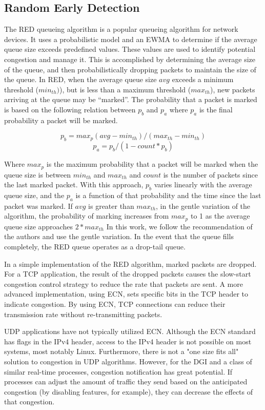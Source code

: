 \subsection{Random Early Detection}
The \ac{RED} queueing algorithm is a popular queueing algorithm for network devices.
It uses a probabilistic model and an \ac{EWMA} to determine if the average queue size exceeds predefined values.
These values are used to identify potential congestion and manage it.
This is accomplished by determining the average size of the queue, and then probabilistically dropping packets to maintain the size of the queue.
In \ac{RED}, when the average queue size $avg$ exceeds a minimum threshold ($min_{th})$), but is less than a maximum threshold ($max_{th}$), new packets arriving at the queue may be ``marked''.
The probability that a packet is marked is based on the following relation between $p_{b}$ and $p_{a}$ where $p_{a}$ is the final probability a packet will be marked.

\begin{equation}
p_{b} = max_p (avg - min_{th}) / (max_{th}-min_{th})
\end{equation}
\begin{equation}
p_{a} = p_{b} / (1-count * p_b)
\end{equation}

Where $max_p$ is the maximum probability that a packet will be marked when the queue size is between $min_{th}$ and $max_{th}$ and $count$ is the number of packets since the last marked packet.
With this approach, $p_{b}$ varies linearly with the average queue size, and the $p_{a}$ is a function of that probability and the time since the last packet was marked.
If $avg$ is greater than $max_{th}$, in the gentle variation of the algorithm, the probability of marking increases from $max_p$ to 1 as the average queue size approaches $2*max_{th}$
In this work, we follow the recommendation of the authors and use the gentle variation.
In the event that the queue fills completely, the \ac{RED} queue operates as a drop-tail queue.

In a simple implementation of the \ac{RED} algorithm, marked packets are dropped.
For a TCP application, the result of the dropped packets causes the slow-start congestion control strategy to reduce the rate that packets are sent.
A more advanced implementation, using \ac{ECN}, sets specific bits in the TCP header to indicate congestion.
By using \ac{ECN}, TCP connections can reduce their transmission rate without re-transmitting packets.

UDP applications have not typically utilized \ac{ECN}.
Although the \ac{ECN} standard has flags in the IPv4 header, access to the IPv4 header is not possible on most systems, most notably Linux.
Furthermore, there is not a "one size fits all" solution to congestion in UDP algorithms.
However, for the \ac{DGI} and a class of similar real-time processes, congestion notification has great potential.
If processes can adjust the amount of traffic they send based on the anticipated congestion (by disabling features, for example), they can decrease the effects of that congestion.

